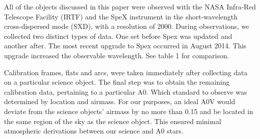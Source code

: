 
All of the objects discussed in this paper were observed with the NASA Infra-Red Telescope Facility (IRTF) and the SpeX instrument \cite{Rayner_1998} in the short-wavelength cross-dispersed mode (SXD), with a resolution of 2000.  During observations, we collected two distinct types of data.  One set before Spex was updated and another after.  The most recent upgrade to Spex occurred in August 2014.  This upgrade increased the observable wavelength.  See table 1 for comparison.


Calibration frames, flats and arcs, were taken immediately after collecting data on a particular science object.  The final step was to obtain the remaining calibration data, pertaining to a particular A0.  Which standard to observe was determined by location and airmass.  For our purposes, an ideal A0V would deviate from the science objects' airmass by no more than 0.15 and be located in the same region of the sky as the science object.  This ensured minimal atmospheric derivations between our science and A0 stars.
